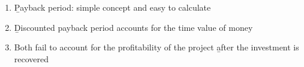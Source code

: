 \begin{enumerate}
    \item \b{Payback period}: simple concept and easy to calculate
    \item \b{Discounted payback period} accounts for the time value of money
    \item Both fail to account for the profitability of the project \b{after} the investment is recovered
\end{enumerate}
